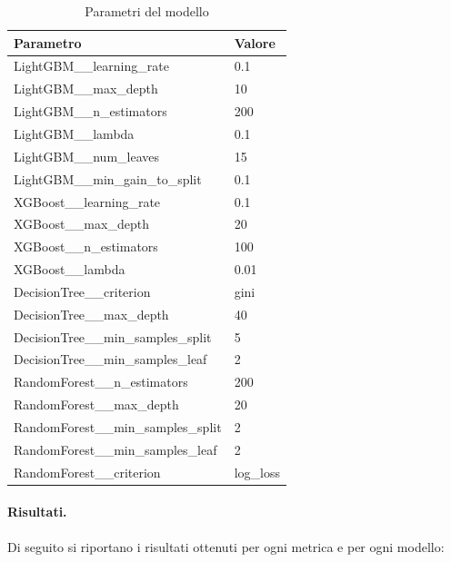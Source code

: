 \begin{table}[H]
    \centering
    \begin{tabular}{|l|l|}
    \toprule
    \textbf{Parametro}                 & \textbf{Valore} \\ \midrule
    LightGBM\_\_learning\_rate            & 0.1             \\ 
    LightGBM\_\_max\_depth                & 10              \\ 
    LightGBM\_\_n\_estimators             & 200             \\ 
    LightGBM\_\_lambda                    & 0.1             \\ 
    LightGBM\_\_num\_leaves               & 15              \\ 
    LightGBM\_\_min\_gain\_to\_split      & 0.1             \\ 
    XGBoost\_\_learning\_rate         & 0.1             \\ 
    XGBoost\_\_max\_depth             & 20              \\ 
    XGBoost\_\_n\_estimators          & 100             \\ 
    XGBoost\_\_lambda                 & 0.01            \\ 
    DecisionTree\_\_criterion         & gini            \\ 
    DecisionTree\_\_max\_depth        & 40              \\ 
    DecisionTree\_\_min\_samples\_split & 5               \\ 
    DecisionTree\_\_min\_samples\_leaf & 2               \\ 
    RandomForest\_\_n\_estimators     & 200             \\ 
    RandomForest\_\_max\_depth        & 20              \\ 
    RandomForest\_\_min\_samples\_split & 2               \\ 
    RandomForest\_\_min\_samples\_leaf & 2               \\ 
    RandomForest\_\_criterion         & log\_loss         \\ \bottomrule
    \end{tabular}
    \caption{Parametri del modello}
    \end{table}

\paragraph{Risultati.} Di seguito si riportano i risultati ottenuti per ogni metrica e per ogni modello:

